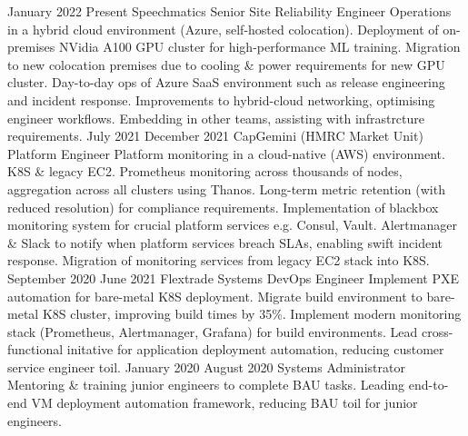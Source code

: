 \documentclass[9pt]{developercv}
\begin{document}
    \begin{entrylist}
        \entry
            {\dateentry
                {January 2022}
                {Present}
            }
            {Speechmatics}
            {Senior Site Reliability Engineer}
            {
                Operations in a hybrid cloud environment (Azure, self-hosted colocation).
                Deployment of on-premises NVidia A100 GPU cluster for high-performance ML training.
                Migration to new colocation premises due to cooling \& power requirements for new GPU cluster.
                Day-to-day ops of Azure SaaS environment such as release engineering and incident response.
                Improvements to hybrid-cloud networking, optimising engineer workflows.
                Embedding in other teams, assisting with infrastrcture requirements.
            }
        \entry
            {\dateentry
                {July 2021}
                {December 2021}
            }
            {CapGemini (HMRC Market Unit)}
            {Platform Engineer}
            {
                Platform monitoring in a cloud-native (AWS) environment. K8S \& legacy EC2.
                Prometheus monitoring across thousands of nodes, aggregation across all clusters using Thanos.
                Long-term metric retention (with reduced resolution) for compliance requirements.
                Implementation of blackbox monitoring system for crucial platform services e.g. Consul, Vault.
                Alertmanager \& Slack to notify when platform services breach SLAs, enabling swift incident response.
                Migration of monitoring services from legacy EC2 stack into K8S.
            }
        \entry
            {\dateentry
                {September 2020}
                {June 2021}
            }
            {Flextrade Systems}
            {DevOps Engineer}
            {
                Implement PXE automation for bare-metal K8S deployment.
                Migrate build environment to bare-metal K8S cluster, improving build times by 35\%.
                Implement modern monitoring stack (Prometheus, Alertmanager, Grafana) for build environments.
                Lead cross-functional initative for application deployment automation, reducing customer service engineer toil.
            }
        \entry
            {\dateentry
                {January 2020}
                {August 2020}
            }
            {}
            {Systems Administrator}
            {
                Mentoring \& training junior engineers to complete BAU tasks.
                Leading end-to-end VM deployment automation framework, reducing BAU toil for junior engineers.
}
\end{entrylist}
\end{document}
